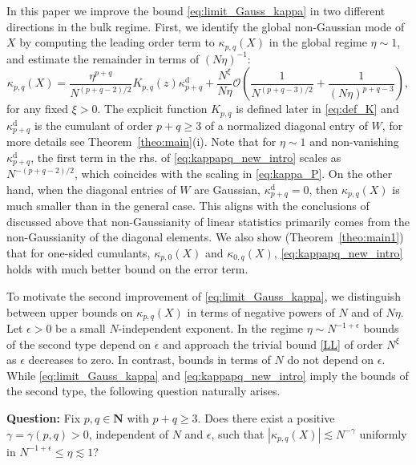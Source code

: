 \documentclass[10pt]{amsart}
\numberwithin{equation}{section}
\newcommand{\dif}{\mathrm{d}}
\newcommand{\N}{\mathbf{N}}
\begin{document}
In this paper we improve the bound \eqref{eq:limit_Gauss_kappa} in two different directions in the bulk regime. First, we identify the global non-Gaussian mode of $X$ by computing the leading order term to
$\kappa_{p,q}(X)$ in the global regime $\eta\sim 1$, and estimate the remainder in terms of $(N\eta)^{-1}$: 
\begin{equation}
\kappa_{p,q}\left(X\right) = \frac{\eta^{p+q}}{N^{(p+q-2)/2}}K_{p,q}(z)\kappa_{p+q}^{\mathrm{d}} + \frac{N^\xi}{N\eta} \mathcal{O}\left( \frac{1}{N^{(p+q-3)/2}}+ \frac{1}{(N\eta)^{p+q-3}}\right),
\label{eq:kappapq_new_intro}
\end{equation}
for any fixed $\xi>0$. The explicit function $K_{p,q}$ is defined later in \eqref{eq:def_K} and $\kappa_{p+q}^\dif$ is the cumulant of order $p+q\ge 3$ of a normalized diagonal entry of $W$, for more details see Theorem~\ref{theo:main}(i). Note that for $\eta\sim 1$ and non-vanishing $\kappa_{p+q}^\dif$, the first term in the rhs. of \eqref{eq:kappapq_new_intro} scales as $N^{-(p+q-2)/2}$, which coincides with the scaling in \eqref{eq:kappa_P}. On the other hand, when the diagonal entries of $W$ are Gaussian, $\kappa_{p+q}^\dif =0$,  then $\kappa_{p,q}(X)$ is much smaller than in the general case. This aligns with the conclusions of \cite{cumulant_asymptotic_2024} discussed above that non-Gaussianity of linear statistics primarily comes from the non-Gaussianity of the diagonal elements. We also show (Theorem~\ref{theo:main1}) that for one-sided cumulants, $\kappa_{p,0}(X)$ and $\kappa_{0,q}(X)$, \eqref{eq:kappapq_new_intro} holds with much better bound on the error term.


To motivate the second improvement of \eqref{eq:limit_Gauss_kappa}, we distinguish between  upper bounds on $\kappa_{p,q}(X)$ in terms of negative powers of $N$ and of $N\eta$. Let $\epsilon>0$ be a small $N$-independent exponent. In the regime $\eta\sim N^{-1+\epsilon}$ bounds of the second type depend on $\epsilon$ and approach the trivial bound \eqref{LL} of order $N^\xi$ as $\epsilon$ decreases to zero. In contrast, bounds in terms of $N$ do not depend on $\epsilon$. While \eqref{eq:limit_Gauss_kappa} and \eqref{eq:kappapq_new_intro} imply the bounds of the second type, the following question naturally arises.

\smallskip

\noindent\textbf{Question:} Fix $p,q\in\N$ with $p+q\ge 3$. Does there exist a positive $\gamma=\gamma(p,q)>0$,
independent of $N$ and $\epsilon$, such that $|\kappa_{p,q}(X)|\lesssim N^{-\gamma}$ uniformly in $N^{-1+\epsilon}\le\eta\lesssim 1$? 
\end{document}
